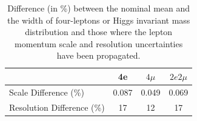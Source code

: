 

\begin{table}[h]
   \centering
    \caption{
    Difference (in \%) between the nominal mean and the width of four-leptons or Higgs invariant mass distribution and those where the lepton momentum scale and resolution uncertainties have been propagated.
    }
    \begin{tabular}{| l | c | c | c |} \hline
                & 4e         & $4\mu$                      & $2e2\mu$       \\ 
\hline \hline
Scale Difference (\%) & 0.087 & 0.049 & 0.069 \\
Resolution Difference (\%) & 17 & 12 & 17 \\
\hline
 \end{tabular}
    \label{tab:leptonscalereso}
\end{table}


